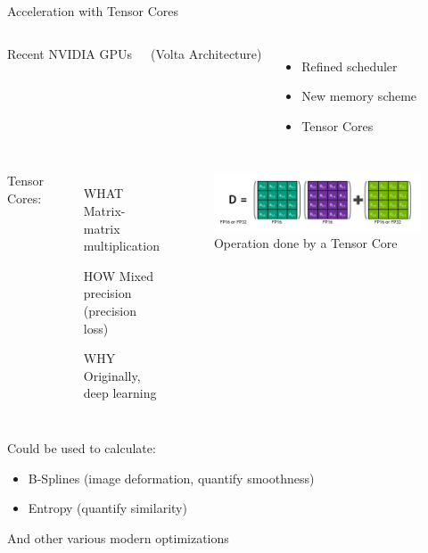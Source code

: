 \begin{frame}{Acceleration with Tensor Cores}
	

		\begin{columns}
			\hfill Recent NVIDIA GPUs
			
			\hfill (Volta Architecture)
			\begin{itemize}
				\item Refined scheduler
				\item New memory scheme
				\item Tensor Cores
			\end{itemize}
		\end{columns} 


	\begin{center}
		\begin{minipage}{0.88\textwidth}
			\begin{columns}
				\column{0.6\linewidth}
				Tensor Cores:
				\begin{itemize}
					\item[WHAT] Matrix-matrix multiplication
					\item[HOW] Mixed precision (precision loss)
					\item[WHY] Originally, deep learning
				\end{itemize}
				\column{0.5\linewidth}
				\begin{figure}
					\includegraphics[width=\textwidth]{tensor_core_op}
					\caption{Operation done by a Tensor Core}
				\end{figure}
			\end{columns}
		\end{minipage}

	\medskip
	\hspace{0.035\textwidth}
	\begin{minipage}{0.85\textwidth}
	Could be used to calculate:
	
	\begin{itemize}
		\item B-Splines (image deformation, quantify smoothness)
		\item Entropy (quantify similarity)
	\end{itemize}
	
	And other various modern optimizations
	\end{minipage}
	\end{center}

		
\end{frame}